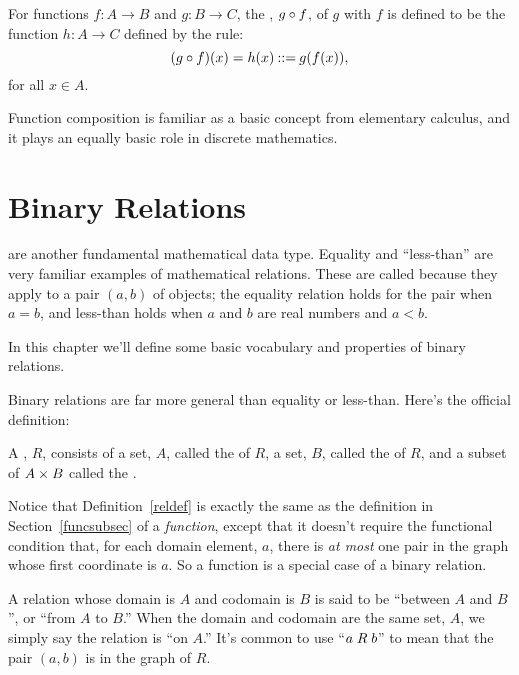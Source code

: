 \begin{definition}\label{func_compose_def}
  For functions $f:A \to B$ and $g:B \to C$, the ,
  $g \circ f$, of $g$ with $f$ is defined to be the function
  $h:A \to C$ defined by the rule:
\begin{displaymath}
(g \circ f)(x) = h(x) \mathbin{::=} g(f(x)),
\end{displaymath}
for all $x \in A$.
\end{definition}

Function composition is familiar as a basic concept from elementary
calculus, and it plays an equally basic role in discrete mathematics.

\section{Binary Relations}

 are another fundamental mathematical data type.  Equality
and ``less-than'' are very familiar examples of mathematical relations.
These are called  because they apply to a pair
$(a,b)$ of objects; the equality relation holds for the pair when $a=b$,
and less-than holds when $a$ and $b$ are real numbers and $a < b$.

In this chapter we'll define some basic vocabulary and properties of binary
relations.

Binary relations are far more general than equality or less-than.
Here's the official definition:
\begin{definition}\label{reldef}
A , $R$, consists of a set, $A$, called
the  of $R$, a set, $B$, called the  of $R$, and
a subset of $A \times B$ called the .
\end{definition}

Notice that Definition~\ref{reldef} is exactly the same as the definition
in Section~\ref{funcsubsec} of a {\emph{function}}, except that it doesn't
require the functional condition that, for each domain element, $a$, there
is \emph{at most} one pair in the graph whose first coordinate is $a$.  So
a function is a special case of a binary relation.

A relation whose domain is $A$ and codomain is $B$ is said to be
``between $A$ and $B$'', or ``from $A$ to $B$.''  When the domain and
codomain are the same set, $A$, we simply say the  relation is ``on $A$.''  It's common to use 
``$a \mathrel{R} b$'' to mean that the pair $(a,b)$ is in the graph of
$R$.

